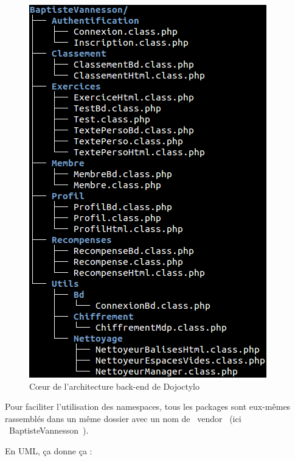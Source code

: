 \documentclass[a4paper,12pt]{article}
\begin{document}
\begin{figure}[!h]
\begin{center}
\includegraphics[scale=0.5]{architecture-backend.png}
\end{center}
\caption{C\oe ur de l'architecture back-end de Dojoctylo}
\end{figure}

Pour faciliter l'utilisation des namespaces, tous les packages sont eux-mêmes rassemblés dans un même dossier avec un nom de \og~vendor~\fg{} (ici \og~BaptisteVannesson~\fg).

En UML, ça donne ça :
\end{document}
